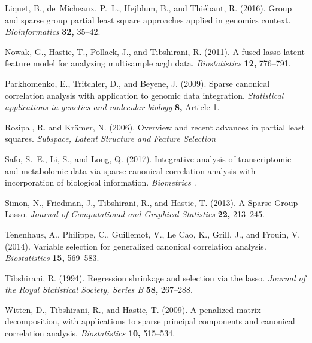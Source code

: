 \documentclass[12pt]{article}
\begin{document}
\begin{description}
\item
Liquet, B., de~Micheaux, P.~L., Hejblum, B., and Thi\'{e}baut, R. (2016).
 Group and sparse group partial least square approaches applied in
  genomics context.
	\textit{Bioinformatics} {\bf 32,} 35--42.

\item
Nowak, G., Hastie, T., Pollack, J., and Tibshirani, R. (2011).
 A fused lasso latent feature model for analyzing multisample acgh
  data.
	\textit{Biostatistics} {\bf 12,} 776--791.


\item
Parkhomenko, E., Tritchler, D., and Beyene, J. (2009).
Sparse canonical correlation analysis with application to genomic
  data integration.
	\textit{Statistical applications in genetics and molecular biology} {\bf
  8,} Article 1.

\item 
Rosipal, R. and Kr\"{a}mer, N. (2006).
Overview and recent advances in partial least squares.
\textit{Subspace, Latent Structure and Feature Selection}

\item
Safo, S.~E., Li, S., and Long, Q. (2017).
 Integrative analysis of transcriptomic and metabolomic data via
  sparse canonical correlation analysis with incorporation of biological
  information.
	\textit{Biometrics} .

\item
Simon, N., Friedman, J., Tibshirani, R., and Hastie, T. (2013).
 A {S}parse-{G}roup {L}asso.
	\textit{Journal of Computational and Graphical Statistics} {\bf 22,}
  213--245.


\item
Tenenhaus, A., Philippe, C., Guillemot, V., {Le Cao}, K., Grill, J., and
  Frouin, V. (2014).
 Variable selection for generalized canonical correlation analysis.
	\textit{Biostatistics} {\bf 15,} 569--583.

\item
Tibshirani, R. (1994).
 Regression shrinkage and selection via the lasso.
	\textit{Journal of the Royal Statistical Society, Series B} {\bf 58,}
  267--288.

\item
Witten, D., Tibshirani, R., and Hastie, T. (2009).
 A penalized matrix decomposition, with applications to sparse
  principal components and canonical correlation analysis.
	\textit{Biostatistics} {\bf 10,} 515--534.

\end{description}
\end{document}
